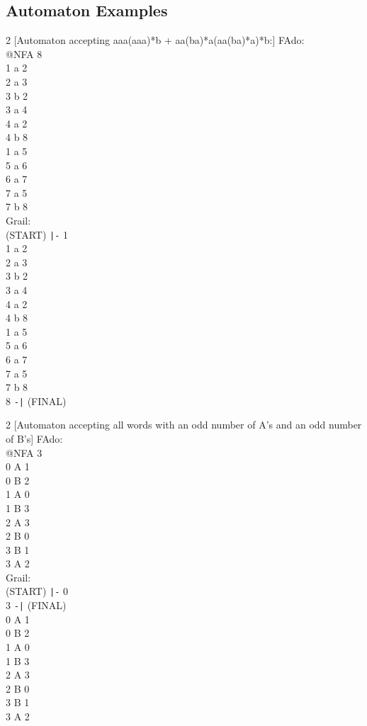 \documentclass{article}
\begin{document}
\subsection{Automaton Examples}
\begin{center}
\raggedright
\begin{multicols}{2}
[Automaton accepting aaa(aaa)*b + aa(ba)*a(aa(ba)*a)*b:]
FAdo:\\
@NFA 8\\
1 a 2\\
2 a 3\\
3 b 2\\
3 a 4\\
4 a 2\\
4 b 8\\
1 a 5\\
5 a 6\\
6 a 7\\
7 a 5\\
7 b 8\\
\columnbreak
Grail:\\
(START) \verb`|-` 1\\1 a 2\\2 a 3\\3 b 2\\3 a 4\\4 a 2\\4 b 8\\1 a 5\\5 a 6\\6 a 7\\7 a 5\\7 b 8\\8 \verb`-|` (FINAL)
\end{multicols}
\end{center}

\begin{center}
\raggedright
\begin{multicols}{2}
[Automaton accepting all words with an odd number of A's and an odd number of B's]
FAdo:\\@NFA 3\\0 A 1\\0 B 2\\1 A 0\\1 B 3\\2 A 3\\2 B 0\\3 B 1\\3 A 2\\
\columnbreak
Grail:\\(START) \verb`|-` 0\\3 \verb`-|` (FINAL)\\0 A 1\\0 B 2\\1 A 0\\1 B 3\\2 A 3\\2 B 0\\3 B 1\\3 A 2\\
\end{multicols}
\end{center}
\end{document}
